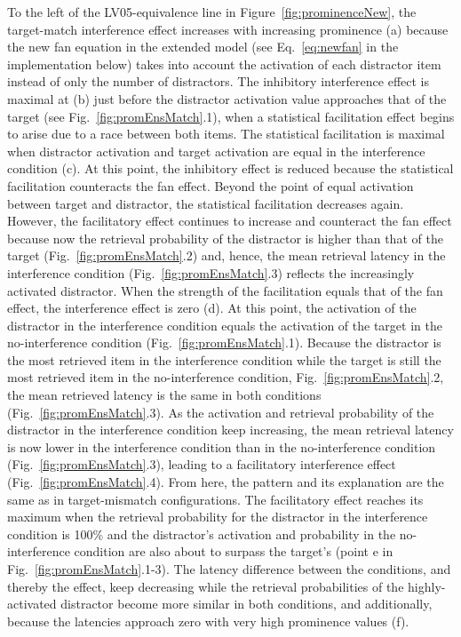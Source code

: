 \documentclass{cambridge7A}\usepackage[]{graphicx}\usepackage[]{color}
\begin{document}
{To the left of the LV05-equivalence line in Figure~\ref{fig:prominenceNew}, the target-match interference effect increases with increasing prominence (a) because the new fan equation in the extended model (see Eq.~\ref{eq:newfan} in the implementation below) takes into account the activation of each distractor item instead of only the number of distractors.
The inhibitory interference effect is maximal at (b) just before the distractor activation value approaches that of the target (see Fig.~\ref{fig:promEnsMatch}.1), when a statistical facilitation effect begins to arise due to a race between both items. The statistical facilitation is maximal when distractor activation and target activation are equal in the interference condition (c). At this point, the inhibitory effect is reduced because the statistical facilitation counteracts the fan effect. 
Beyond the point of equal activation between target and distractor, the statistical facilitation decreases again. However, the facilitatory effect continues to increase and counteract the fan effect because now the retrieval probability of the distractor is higher than that of the target (Fig.~\ref{fig:promEnsMatch}.2) and, hence, the mean retrieval latency in the interference condition (Fig.~\ref{fig:promEnsMatch}.3) reflects the increasingly activated distractor. 
When the strength of the facilitation equals that of the fan effect, the interference effect is zero (d). At this point, the activation of the distractor in the interference condition equals the activation of the target in the no-interference condition (Fig.~\ref{fig:promEnsMatch}.1). Because the distractor is the most retrieved item in the interference condition while the target is still the most retrieved item in the no-interference condition, Fig.~\ref{fig:promEnsMatch}.2, the mean retrieved latency is the same in both conditions (Fig.~\ref{fig:promEnsMatch}.3).
As the activation and retrieval probability of the distractor in the interference condition keep increasing, the mean retrieval latency is now lower in the interference condition than in the no-interference condition (Fig.~\ref{fig:promEnsMatch}.3), leading to a facilitatory interference effect (Fig.~\ref{fig:promEnsMatch}.4). 
From here, the pattern and its explanation are the same as in target-mismatch configurations. The facilitatory effect reaches its maximum when the retrieval probability for the distractor in the interference condition is 100\% and the distractor's activation and probability in the no-interference condition are also about to surpass the target's (point e in Fig.~\ref{fig:promEnsMatch}.1-3). The latency difference between the conditions, and thereby the effect, keep decreasing while the retrieval probabilities of the highly-activated distractor become more similar in both conditions, and additionally, because the latencies approach zero with very high prominence values (f).
}
\end{document}

